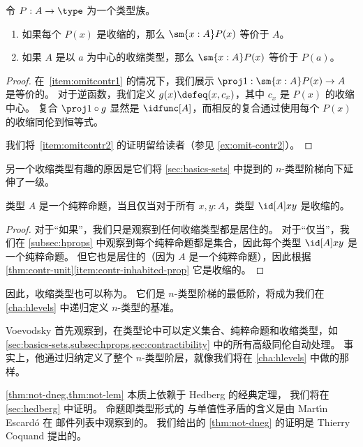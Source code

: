 \begin{lem}\label{thm:omit-contr}
令 $P:A\to\type$ 为一个类型族。
\begin{enumerate}
  \item 如果每个 $P(x)$ 是收缩的，那么 $\sm{x:A} P(x)$ 等价于 $A$。\label{item:omitcontr1}
  \item 如果 $A$ 是以 $a$ 为中心的收缩类型，那么 $\sm{x:A} P(x)$ 等价于 $P(a)$。\label{item:omitcontr2}
\end{enumerate}
\end{lem}
\begin{proof}
  在~\ref{item:omitcontr1} 的情况下，我们展示 $\proj1:\sm{x:A} P(x) \to A$ 是等价的。
  对于逆函数，我们定义 $g(x)\defeq (x,c_x)$，其中 $c_x$ 是 $P(x)$ 的收缩中心。
  复合 $\proj1 \circ g$ 显然是 $\idfunc[A]$，而相反的复合通过使用每个 $P(x)$ 的收缩同伦到恒等式。

  我们将~\ref{item:omitcontr2} 的证明留给读者（参见 \cref{ex:omit-contr2}）。
\end{proof}

另一个收缩类型有趣的原因是它们将 \cref{sec:basics-sets} 中提到的 $n$-类型阶梯向下延伸了一级。

\begin{lem}\label{thm:prop-minusonetype}
类型 $A$ 是一个纯粹命题，当且仅当对于所有 $x,y:A$，类型 $\id[A]xy$ 是收缩的。
\end{lem}
\begin{proof}
  对于“如果”，我们只是观察到任何收缩类型都是居住的。
  对于“仅当”，我们在 \cref{subsec:hprops} 中观察到每个纯粹命题都是集合，因此每个类型 $\id[A]xy$ 是一个纯粹命题。
  但它也是居住的（因为 $A$ 是一个纯粹命题），因此根据 \cref{thm:contr-unit}\ref{item:contr-inhabited-prop} 它是收缩的。
\end{proof}

因此，收缩类型也可以称为。
它们是 $n$-类型阶梯的最低阶，将成为我们在 \cref{cha:hlevels} 中递归定义 $n$-类型的基准。

%
%

\sectionNotes

Voevodsky 首先观察到，在类型论中可以定义集合、纯粹命题和收缩类型，如 \cref{sec:basics-sets,subsec:hprops,sec:contractibility} 中的所有高级同伦自动处理。
事实上，他通过归纳定义了整个 $n$-类型阶层，就像我们将在 \cref{cha:hlevels} 中做的那样。%

\cref{thm:not-dneg,thm:not-lem} 本质上依赖于 Hedberg 的经典定理，
%
%
我们将在 \cref{sec:hedberg} 中证明。
命题即类型形式的 \LEM{} 与单值性矛盾的含义是由 Mart\'\i n Escard\'o 在 \Agda 邮件列表中观察到的。
我们给出的 \cref{thm:not-dneg} 的证明是 Thierry Coquand 提出的。

